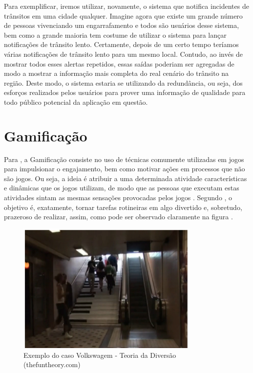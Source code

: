 Para exemplificar, iremos utilizar, novamente,  o sistema que notifica incidentes de trânsitos em uma cidade qualquer. Imagine agora que existe um grande número de pessoas vivenciando um engarrafamento e todos são usuários desse sistema, bem como a grande maioria tem costume de utilizar o sistema para lançar notificações de trânsito lento. Certamente, depois de um certo tempo teríamos várias notificações de trânsito lento para um mesmo local. Contudo, ao invés de mostrar todos esses alertas repetidos, essas saídas poderiam ser agregadas de modo a mostrar a informação mais completa do real cenário do trânsito na região. Deste modo, o sistema estaria se utilizando da redundância, ou seja, dos esforços realizados pelos usuários para prover uma informação de qualidade para todo público potencial da aplicação em questão.  

\section{Gamificação}
Para \cite{deterding2011}, a Gamificação consiste no uso de técnicas comumente utilizadas em jogos para impulsionar o engajamento, bem como motivar ações em processos que não são jogos. Ou seja, a ideia é atribuir a uma determinada atividade características e dinâmicas que os jogos utilizam, de modo que as pessoas que executam estas atividades sintam as mesmas sensações  provocadas pelos jogos \citep{pereira2011}. Segundo \cite{duggan2013}, o objetivo é, exatamente, tornar tarefas rotineiras em algo divertido e, sobretudo, prazeroso de realizar, assim, como pode ser observado claramente na figura . 

\begin{figure}[htp]
\begin{center}
  \includegraphics[width=9cm]{images/escada_gamificacao.png}
  \caption[Caso Volkswagem]{Exemplo do caso Volkswagem  - Teoria da Diversão (thefuntheory.com)}
  \label{fig:exampleFigPiano}
\end{center}
\end{figure}

